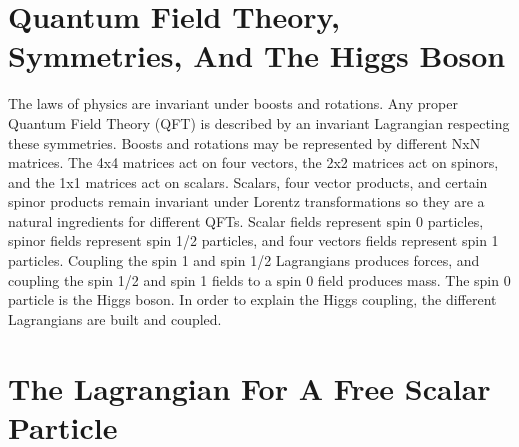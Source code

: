 \section{Quantum Field Theory, Symmetries, And The Higgs Boson}

The laws of physics are invariant under boosts and rotations. Any proper Quantum Field Theory (QFT) is described by an invariant Lagrangian respecting these symmetries. Boosts and rotations may be represented by different NxN matrices. The 4x4 matrices act on four vectors, the 2x2 matrices act on spinors, and the 1x1 matrices act on scalars. Scalars, four vector products, and certain spinor products remain invariant under Lorentz transformations so they are a natural ingredients for different QFTs. Scalar fields represent spin 0 particles, spinor fields represent spin 1/2 particles, and four vectors fields represent spin 1 particles. Coupling the spin 1 and spin 1/2 Lagrangians produces forces, and coupling the spin 1/2 and spin 1 fields to a spin 0 field produces mass. The spin 0 particle is the Higgs boson. In order to explain the Higgs coupling, the different Lagrangians are built and coupled. 

\section{The Lagrangian For A Free Scalar Particle}

